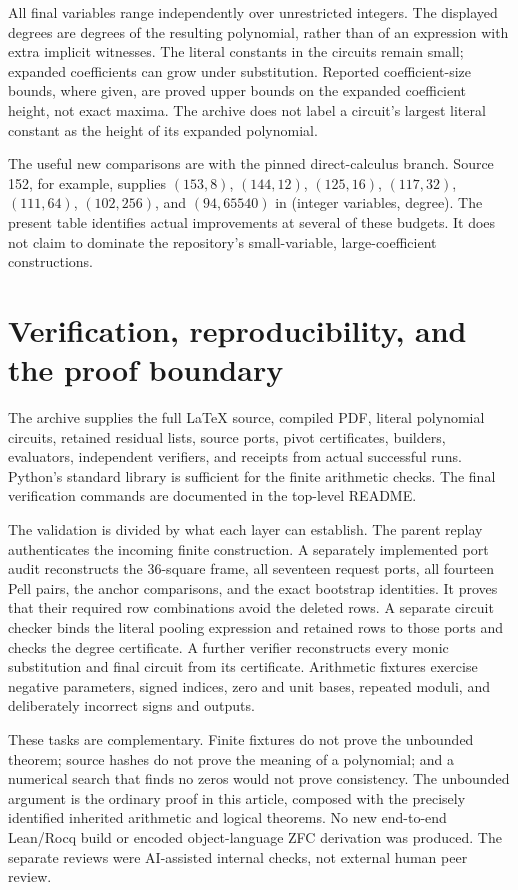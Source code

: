 \documentclass[11pt]{article}
\theoremstyle{definition}\newtheorem{definition}[theorem]{Definition}
\begin{document}


All final variables range independently over unrestricted integers.
The displayed degrees are degrees of the resulting polynomial, rather
than of an expression with extra implicit witnesses. The literal
constants in the circuits remain small; expanded coefficients can grow
under substitution. Reported coefficient-size bounds, where given, are
proved upper bounds on the expanded coefficient height, not exact maxima.
The archive does not label a circuit's largest literal constant as the
height of its expanded polynomial.

The useful new comparisons are with the pinned direct-calculus branch.
Source 152, for example, supplies $(153,8)$, $(144,12)$, $(125,16)$,
$(117,32)$, $(111,64)$, $(102,256)$, and $(94,65540)$ in
(integer variables, degree). The present table identifies actual
improvements at several of these budgets. It does not claim to dominate
the repository's small-variable, large-coefficient constructions.

\section{Verification, reproducibility, and the proof boundary}
\label{sec:verification}

The archive supplies the full LaTeX source, compiled PDF, literal
polynomial circuits, retained residual lists, source ports, pivot
certificates, builders, evaluators, independent verifiers, and receipts
from actual successful runs. Python's standard library is sufficient
for the finite arithmetic checks. The final verification commands are
documented in the top-level README.

The validation is divided by what each layer can establish. The parent
replay authenticates the incoming finite construction. A separately
implemented port audit reconstructs the 36-square frame, all seventeen
request ports, all fourteen Pell pairs, the anchor comparisons, and
the exact bootstrap identities. It proves that their required row
combinations avoid the deleted rows. A separate circuit checker binds
the literal pooling expression and retained rows to those ports and
checks the degree certificate. A further verifier reconstructs every
monic substitution and final circuit from its certificate. Arithmetic
fixtures exercise negative parameters, signed indices, zero and unit
bases, repeated moduli, and deliberately incorrect signs and outputs.

These tasks are complementary. Finite fixtures do not prove the
unbounded theorem; source hashes do not prove the meaning of a
polynomial; and a numerical search that finds no zeros would not prove
consistency. The unbounded argument is the ordinary proof in this
article, composed with the precisely identified inherited arithmetic
and logical theorems. No new end-to-end Lean/Rocq build or encoded
object-language ZFC derivation was produced. The separate reviews were
AI-assisted internal checks, not external human peer review.
\end{document}
